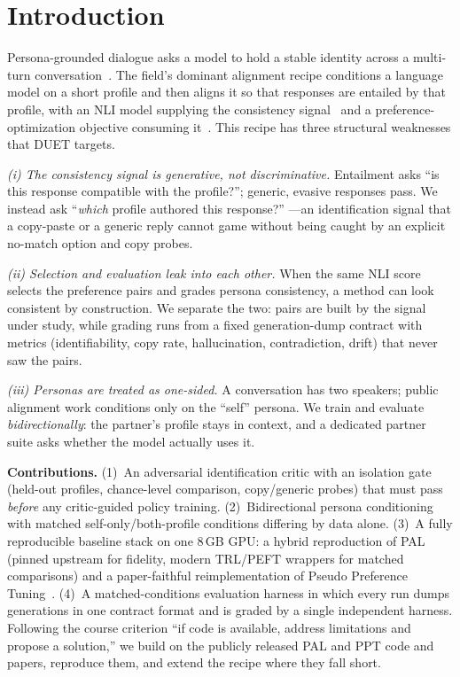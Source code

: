 \documentclass[lettersize,journal]{IEEEtran}
\begin{document}
\section{Introduction}
\label{sec:intro}
Persona-grounded dialogue asks a model to hold a stable identity across a
multi-turn conversation~\cite{zhang2018personachat}. The field's dominant
alignment recipe conditions a language model on a short profile and then aligns
it so that responses are entailed by that profile, with an NLI model supplying
the consistency signal~\cite{welleck2019dnli} and a preference-optimization
objective consuming it~\cite{li2025pal,takayama2025ppt,rafailov2023dpo}. This
recipe has three structural weaknesses that DUET targets.

\emph{(i) The consistency signal is generative, not discriminative.} Entailment
asks ``is this response compatible with the profile?''; generic, evasive
responses pass. We instead ask ``\emph{which} profile authored this response?''
---an identification signal that a copy-paste or a generic reply cannot game
without being caught by an explicit no-match option and copy probes.

\emph{(ii) Selection and evaluation leak into each other.} When the same NLI
score selects the preference pairs and grades persona consistency, a method can
look consistent by construction. We separate the two: pairs are built by the
signal under study, while grading runs from a fixed generation-dump contract
with metrics (identifiability, copy rate, hallucination, contradiction, drift)
that never saw the pairs.

\emph{(iii) Personas are treated as one-sided.} A conversation has two
speakers; public alignment work conditions only on the ``self'' persona. We train
and evaluate \emph{bidirectionally}: the partner's profile stays in context, and
a dedicated partner suite asks whether the model actually uses it.

\textbf{Contributions.}
(1)~An adversarial identification critic with an isolation gate (held-out
profiles, chance-level comparison, copy/generic probes) that must pass
\emph{before} any critic-guided policy training.
(2)~Bidirectional persona conditioning with matched self-only/both-profile
conditions differing by data alone.
(3)~A fully reproducible baseline stack on one 8\,GB GPU: a hybrid reproduction
of PAL (pinned upstream for fidelity, modern TRL/PEFT wrappers for matched
comparisons) and a paper-faithful reimplementation of Pseudo Preference
Tuning~\cite{takayama2025ppt}.
(4)~A matched-conditions evaluation harness in which every run dumps
generations in one contract format and is graded by a single independent
harness.
Following the course criterion ``if code is available, address limitations and
propose a solution,'' we build on the publicly released PAL and PPT code and
papers, reproduce them, and extend the recipe where they fall short.
\end{document}
